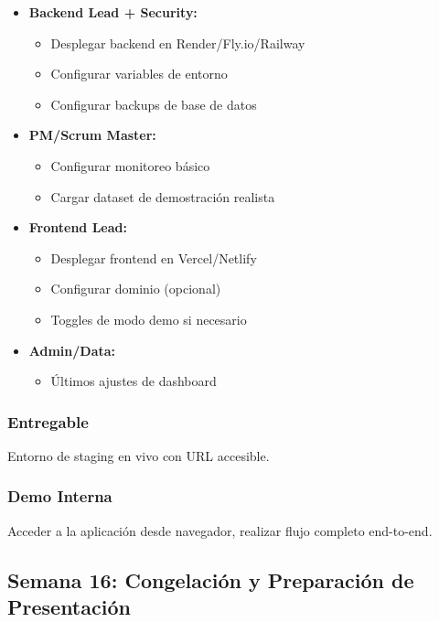 \documentclass[12pt,a4paper]{article}
\begin{document}
\begin{itemize}[leftmargin=*]
    \item \textbf{Backend Lead + Security:}
    \begin{itemize}
        \item Desplegar backend en Render/Fly.io/Railway
        \item Configurar variables de entorno
        \item Configurar backups de base de datos
    \end{itemize}
    
    \item \textbf{PM/Scrum Master:}
    \begin{itemize}
        \item Configurar monitoreo básico
        \item Cargar dataset de demostración realista
    \end{itemize}
    
    \item \textbf{Frontend Lead:}
    \begin{itemize}
        \item Desplegar frontend en Vercel/Netlify
        \item Configurar dominio (opcional)
        \item Toggles de modo demo si necesario
    \end{itemize}
    
    \item \textbf{Admin/Data:}
    \begin{itemize}
        \item Últimos ajustes de dashboard
    \end{itemize}
\end{itemize}

\subsubsection{Entregable}
Entorno de staging en vivo con URL accesible.

\subsubsection{Demo Interna}
Acceder a la aplicación desde navegador, realizar flujo completo end-to-end.

\subsection{Semana 16: Congelación y Preparación de Presentación}
\end{document}
